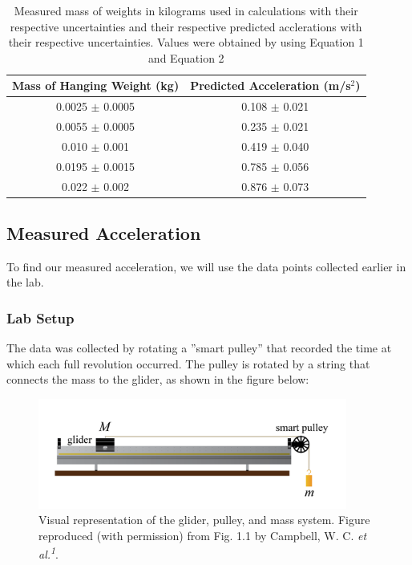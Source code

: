 \documentclass[titlepage]{article}
\begin{document}
\begin{table}[!htbp]
\renewcommand{\arraystretch}{1.3}
\centering
\begin{tabular}{c|c}
    \hline
    \hline
    Mass of Hanging Weight (kg) &  Predicted Acceleration (m/s$^2$)\\
    \hline
    \hline

    0.0025 $\pm$ 0.0005 &  0.108 $\pm$ 0.021 \\
    \hline

    0.0055 $\pm$ 0.0005 &  0.235 $\pm$ 0.021 \\
    \hline

    0.010 $\pm$ 0.001 &  0.419 $\pm$ 0.040 \\
    \hline

    0.0195 $\pm$ 0.0015 &  0.785 $\pm$ 0.056 \\
    \hline

    0.022 $\pm$ 0.002 &  0.876 $\pm$ 0.073 \\
    \hline
\end{tabular}
\caption{Measured mass of weights in kilograms used in calculations with their respective uncertainties and their respective predicted acclerations with their respective uncertainties. Values were obtained by using Equation 1 and Equation 2}
\end{table}

\pagebreak

\subsection{Measured Acceleration}
To find our measured acceleration, we will use the data points collected earlier in the lab. 

\subsubsection{Lab Setup}
The data was collected by rotating a ''smart pulley'' that recorded the time at which each full revolution occurred. The pulley is rotated by a string that connects the mass to the glider, as shown in the figure below:

\begin{figure}[ht]
    \centering
    \includegraphics[width=4.0in]{Diagram.png}
    \caption{Visual representation of the glider, pulley, and mass system. Figure reproduced
(with permission) from Fig. 1.1 by Campbell, W. C. \textit{et al.\textsuperscript{1}}.}
\end{figure}
\end{document}
